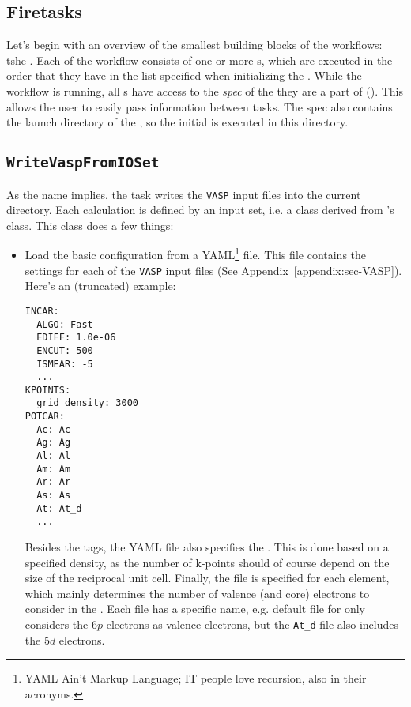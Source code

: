 \begin{refsection}
\section{Firetasks} \label{automation:sec-firetasks}

Let's begin with an overview of the smallest building blocks of the workflows: tshe . Each  of the workflow consists of one or more s, which are executed in the order that they have in the list specified when initializing the . While the workflow is running, all s have access to the \textit{spec} of the  they are a part of (). This allows the user to easily pass information between tasks. The spec also contains the launch directory of the , so the initial  is executed in this directory.

\subsection{\texttt{WriteVaspFromIOSet}} \label{automation:sec-WriteVaspFromIOSet}

As the name implies, the  task writes the \texttt{VASP} input files into the current directory. Each calculation is defined by an input set, i.e. a class derived from 's  class. This class does a few things:

\begin{itemize}

\item Load the basic configuration from a YAML\footnote{YAML Ain't Markup Language; IT people love recursion, also in their acronyms.} file. This file contains the settings for each of the \texttt{VASP} input files (See Appendix~\ref{appendix:sec-VASP}). Here's an (truncated) example:
\begin{verbatim}
INCAR:
  ALGO: Fast
  EDIFF: 1.0e-06
  ENCUT: 500
  ISMEAR: -5
  ...
KPOINTS:
  grid_density: 3000
POTCAR:
  Ac: Ac
  Ag: Ag
  Al: Al
  Am: Am
  Ar: Ar
  As: As
  At: At_d
  ...
\end{verbatim}
Besides the  tags, the YAML file also specifies the . This is done based on a specified density, as the number of k-points should of course depend on the size of the reciprocal unit cell. Finally, the  file is specified for each element, which mainly determines the number of valence (and core) electrons to consider in the . Each  file has a specific name, e.g. default file for  only considers the 6$p$ electrons as valence electrons, but the \texttt{At\_d} file also includes the 5$d$ electrons.


\end{itemize}
\end{refsection}
